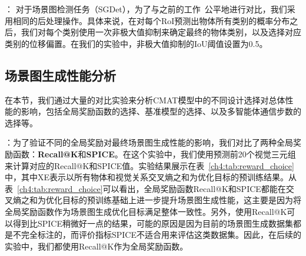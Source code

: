 \textbf{}： 对于场景图检测任务（SGDet），为了与之前的工作~\cite{zellers2018neural,zhang2019graphical}公平地进行对比，我们采用相同的后处理操作。具体来说，在对每个RoI预测出物体所有类别的概率分布之后，我们对每个类别使用一次非极大值抑制来确定最终的物体类别，以及选择对应类别的位移偏置。在我们的实验中，非极大值抑制的IoU阈值设置为0.5。


\subsection{场景图生成性能分析}
在本节，我们通过大量的对比实验来分析CMAT模型中的不同设计选择对总体性能的影响，包括全局奖励函数的选择、基准模型的选择、以及多智能体通信步数的选择等。

\textbf{}：为了验证不同的全局奖励对最终场景图生成性能的影响，我们对比了两种全局奖励函数：\textbf{Recall@K}和\textbf{SPICE}。在这个实验中，我们使用预测前20个视觉三元组来计算对应的Recall@K和SPICE值。实验结果展示在表~\ref{ch4:tab:reward_choice}中，其中XE表示以所有物体和视觉关系交叉熵之和为优化目标的预训练结果。从表~\ref{ch4:tab:reward_choice}可以看出，全局奖励函数Recall@K和SPICE都能在交叉熵之和为优化目标的预训练基础上进一步提升场景图生成性能，这主要是因为将全局奖励函数作为场景图生成优化目标满足整体一致性。另外，使用Recall@K可以得到比SPICE稍微好一点的结果，可能的原因是因为目前的场景图生成数据集都是不完全标注的，而评价指标SPICE不适合用来评估这类数据集。因此，在后续的实验中，我们都使用Recall@K作为全局奖励函数。

\begin{table}[t]
\begin{center}
\end{center}
\caption{不同全局奖励函数对性能的影响}
\label{ch4:tab:reward_choice}
\end{table}


